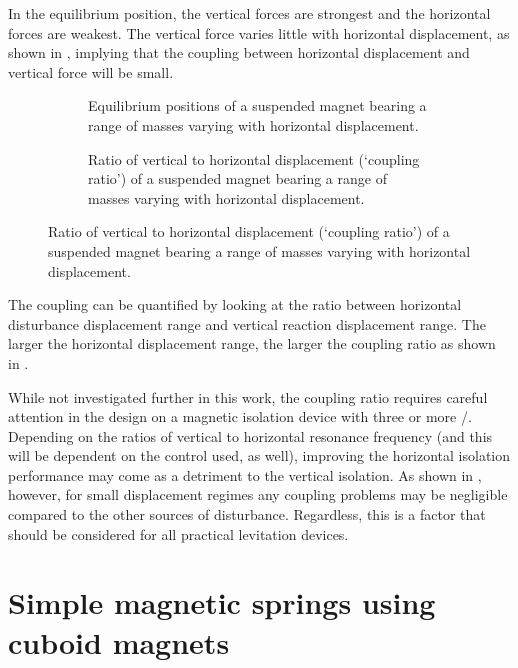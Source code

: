 \documentclass[11pt,a4paper]{memoir}
\begin{document}
In the equilibrium position, the vertical forces are strongest and the
horizontal forces are weakest. The vertical force varies little with
horizontal displacement, as shown in , implying
that the coupling between horizontal displacement and vertical force will be
small.

\begin{figure}
\begin{wide}
  \begin{subfigure}
  \caption{Equilibrium positions of a suspended magnet bearing a range of
  masses varying with horizontal displacement.}
  \end{subfigure}\hfil
  \begin{subfigure}
  \caption{Ratio of vertical to horizontal displacement (`coupling ratio') of
  a suspended magnet bearing a range of masses varying with horizontal
  displacement.}
  \end{subfigure}
\end{wide}
\end{figure}

The coupling can be quantified by looking at the ratio between horizontal
disturbance displacement range and vertical reaction displacement range. The
larger the horizontal displacement range, the larger the coupling ratio as
shown in .

While not investigated further in this work, the coupling ratio requires careful attention in the design on a magnetic isolation device with three or more \dof/.
Depending on the ratios of vertical to horizontal resonance frequency (and this will be dependent on the control used, as well), improving the horizontal isolation performance may come as a detriment to the vertical isolation.
As shown in , however, for small displacement regimes any coupling problems may be negligible compared to the other sources of disturbance.
Regardless, this is a factor that should be considered for all practical levitation devices.


\section{Simple magnetic springs using cuboid magnets}
\end{document}
